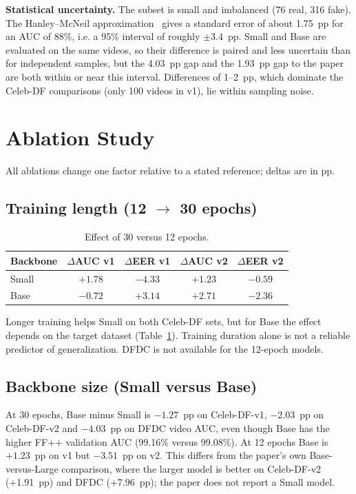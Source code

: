 \documentclass[lettersize,journal]{IEEEtran}
\begin{document}
\textbf{Statistical uncertainty.} The subset is small and imbalanced (76 real, 316 fake). The Hanley--McNeil approximation~\cite{hanley1982meaning} gives a standard error of about 1.75~pp for an AUC of 88\%, i.e. a 95\% interval of roughly $\pm3.4$~pp. Small and Base are evaluated on the same videos, so their difference is paired and less uncertain than for independent samples, but the 4.03~pp gap and the 1.93~pp gap to the paper are both within or near this interval. Differences of 1--2~pp, which dominate the Celeb-DF comparisons (only 100 videos in v1), lie within sampling noise.

\section{Ablation Study}
All ablations change one factor relative to a stated reference; deltas are in pp.

\subsection{Training length (12 $\to$ 30 epochs)}
\begin{table}[!t]
\caption{Effect of 30 versus 12 epochs.\label{tab:epochs}}
\centering
\footnotesize
\setlength{\tabcolsep}{3pt}
\begin{tabular}{|l||c|c|c|c|}
\hline
Backbone & $\Delta$AUC v1 & $\Delta$EER v1 & $\Delta$AUC v2 & $\Delta$EER v2\\
\hline
Small & $+1.78$ & $-4.33$ & $+1.23$ & $-0.59$\\
Base & $-0.72$ & $+3.14$ & $+2.71$ & $-2.36$\\
\hline
\end{tabular}
\end{table}
Longer training helps Small on both Celeb-DF sets, but for Base the effect depends on the target dataset (Table~\ref{tab:epochs}). Training duration alone is not a reliable predictor of generalization. DFDC is not available for the 12-epoch models.

\subsection{Backbone size (Small versus Base)}
At 30 epochs, Base minus Small is $-1.27$~pp on Celeb-DF-v1, $-2.03$~pp on Celeb-DF-v2 and $-4.03$~pp on DFDC video AUC, even though Base has the higher FF++ validation AUC (99.16\% versus 99.08\%). At 12 epochs Base is $+1.23$~pp on v1 but $-3.51$~pp on v2. This differs from the paper's own Base-versus-Large comparison, where the larger model is better on Celeb-DF-v2 (+1.91~pp) and DFDC (+7.96~pp); the paper does not report a Small model.
\end{document}
